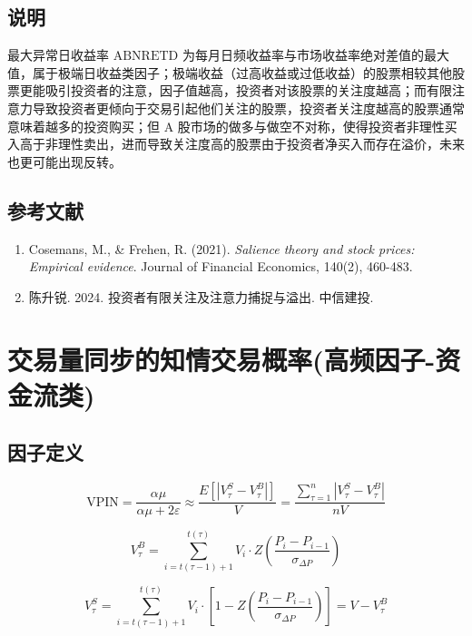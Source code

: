 \documentclass{article}
\begin{document}
\subsection{说明}
最大异常日收益率 \( \mathrm{ABNRETD} \) 为每月日频收益率与市场收益率绝对差值的最大值，属于极端日收益类因子；极端收益（过高收益或过低收益）的股票相较其他股票更能吸引投资者的注意，因子值越高，投资者对该股票的关注度越高；而有限注意力导致投资者更倾向于交易引起他们关注的股票，投资者关注度越高的股票通常意味着越多的投资购买；但 A 股市场的做多与做空不对称，使得投资者非理性买入高于非理性卖出，进而导致关注度高的股票由于投资者净买入而存在溢价，未来也更可能出现反转。

\subsection{参考文献}
\begin{enumerate}
    \item Cosemans, M., \& Frehen, R. (2021). \textit{Salience theory and stock prices: Empirical evidence}. Journal of Financial Economics, 140(2), 460-483.
    \item 陈升锐. 2024. 投资者有限关注及注意力捕捉与溢出. 中信建投.
\end{enumerate}

\section{交易量同步的知情交易概率(高频因子-资金流类)}

\subsection{因子定义}

\begin{equation}
    \mathrm{VPIN} = \frac{\alpha\mu}{\alpha\mu + 2\varepsilon} \approx \frac{E[|V_\tau^S - V_\tau^B|]}{V} = \frac{\sum_{\tau=1}^n |V_\tau^S - V_\tau^B|}{nV}
\end{equation}

\begin{equation}
    V_\tau^B = \sum_{i=t(\tau-1)+1}^{t(\tau)} V_i \cdot Z \left( \frac{P_i - P_{i-1}}{\sigma_{\Delta P}} \right)
\end{equation}

\begin{equation}
    V_\tau^S = \sum_{i=t(\tau-1)+1}^{t(\tau)} V_i \cdot \left[ 1 - Z \left( \frac{P_i - P_{i-1}}{\sigma_{\Delta P}} \right) \right] = V - V_\tau^B
\end{equation}
\end{document}
